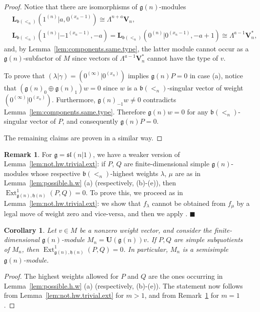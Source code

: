 \documentclass[12pt]{amsart}
\newcommand\g{\mathfrak{g}}
\newcommand\fh{\mathfrak{h}}
\newcommand\fb{\mathfrak{b}}
\newcommand\fsl{\mathfrak{sl}}
\newcommand\bV{\mathbf{V}}
\newcommand\bU{\mathbf{U}}
\newcommand\bL{\mathbf{L}}
\DeclareMathOperator{\Ext}{Ext}
\theoremstyle{plain}
\newtheorem{cor}[theo]{Corollary}
\theoremstyle{definition}
\newtheorem{rem}[theo]{Remark}
\numberwithin{equation}{section}
\newcommand\xqed[1]{%
  \leavevmode\unskip\penalty9999 \hbox{}\nobreak\hfill
  \quad\hbox{#1}}
\newcommand\demo{\xqed{$\blacksquare$}}
\begin{document}
\begin{proof}
Notice that there are isomorphisms of $\g(n)$-modules
\begin{align*}
& \bL_{\fb(<_n)}(1^{(n)}|a, 0^{(x_n-1)}) \cong \Lambda^{n+a}\bV_n, \\
& \bL_{\fb(<_n)}(1^{(n)} | -1^{(x_n-1)}, -a) = \bL_{\fb(<_n)}(0^{(n)} | 0^{(x_n-1)}, -a+1)\cong \Lambda^{a-1}\bV_n^*,
\end{align*}
and, by Lemma~\ref{lem:components.same.type}, the latter module cannot occur as a $\g(n)$-subfactor of $M$ since vectors of $\Lambda^{a-1}\bV_n^*$ cannot have the type of $v$. %

To prove that $(\lambda | \gamma) = (0^{(\infty)}| 0^{(x_n)})$ implies $\g(n)P=0$ in case (a), notice that $(\g(n)_0\oplus \g(n)_{ 1}) w=0$ since  $w$ is a $\fb(<_n)$-singular  vector of weight $(0^{(\infty)}| 0^{(x_n)})$. Furthermore, $\g(n)_{-1}w\neq 0$ contradicts Lemma~\ref{lem:components.same.type}. Therefore $\g(n)w=0$ for any $\fb(<_n)$-singular vector of $P$, and consequently $\g(n)P=0$.

The remaining claims are proven in a similar way.
\end{proof}

\begin{rem}\label{rem:not.hw.trivial.ext.n=1}
For $\g = \fsl(n | 1)$, we have a weaker version of Lemma~\ref{lem:not.hw.trivial.ext}: if $P$, $Q$ are finite-dimensional simple $\g(n)$-modules whose respective $\fb(<_n)$-highest weights $\lambda$, $\mu$ are as in Lemma~\ref{lem:possible.h.w} (a) (respectively, (b)-(e)), then $\Ext_{\g(n), \fh(n)}^1 (P, Q)=0$. To prove this, we proceed as in Lemma~\ref{lem:not.hw.trivial.ext}: we show that $f_\lambda$ cannot be obtained from $f_\mu$ by a legal move of weight zero and vice-versa, and then we apply \cite{MS11}. \demo
\end{rem}

\begin{cor}\label{cor:M_n.semisimple}
Let $v\in M$ be a nonzero weight vector, and consider the finite-dimensional $\g(n)$-module $M_n = \bU(\g(n)) v$. If $P, Q$ are simple subquotients of $M_n$, then $\Ext_{\g(n), \fh(n)}^1 (P,Q)=0$. In particular, $M_n$ is a semisimple $\g(n)$-module.
\end{cor}
\begin{proof}
The highest weights allowed for $P$ and $Q$ are the ones occurring in Lemma~\ref{lem:possible.h.w} (a) (respectively, (b)-(e)). The statement now follows from Lemma~\ref{lem:not.hw.trivial.ext} for $m>1$, and from Remark~\ref{rem:not.hw.trivial.ext.n=1} for $m=1$.
\end{proof}
\end{document}
